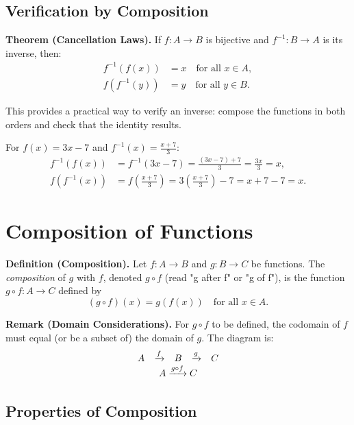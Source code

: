 \documentclass[11pt,a4paper]{article}
\begin{document}
\subsection{Verification by Composition}

\textbf{Theorem (Cancellation Laws).} If $f: A \to B$ is bijective and $f^{-1}: B \to A$ is its inverse, then:
\begin{align*}
    f^{-1}(f(x)) &= x \quad \text{for all } x \in A, \\
    f(f^{-1}(y)) &= y \quad \text{for all } y \in B.
\end{align*}

This provides a practical way to verify an inverse: compose the functions in both orders and check that the identity results.

\begin{example}
For $f(x) = 3x - 7$ and $f^{-1}(x) = \frac{x+7}{3}$:
\begin{align*}
    f^{-1}(f(x)) &= f^{-1}(3x - 7) = \frac{(3x - 7) + 7}{3} = \frac{3x}{3} = x, \\
    f(f^{-1}(x)) &= f\!\left(\frac{x+7}{3}\right) = 3\left(\frac{x+7}{3}\right) - 7 = x + 7 - 7 = x.
\end{align*}
\end{example}

\section{Composition of Functions}

\textbf{Definition (Composition).} Let $f: A \to B$ and $g: B \to C$ be functions. The \textit{composition} of $g$ with $f$, denoted $g \circ f$ (read "g after f" or "g of f"), is the function $g \circ f: A \to C$ defined by
\begin{equation*}
    (g \circ f)(x) = g(f(x)) \quad \text{for all } x \in A.
\end{equation*}

\textbf{Remark (Domain Considerations).} For $g \circ f$ to be defined, the codomain of $f$ must equal (or be a subset of) the domain of $g$. The diagram is:
\[
\begin{array}{ccccc}
    A & \xrightarrow{f} & B & \xrightarrow{g} & C \\
    \multicolumn{5}{c}{A \xrightarrow{g \circ f} C}
\end{array}
\]

\subsection{Properties of Composition}
\end{document}
